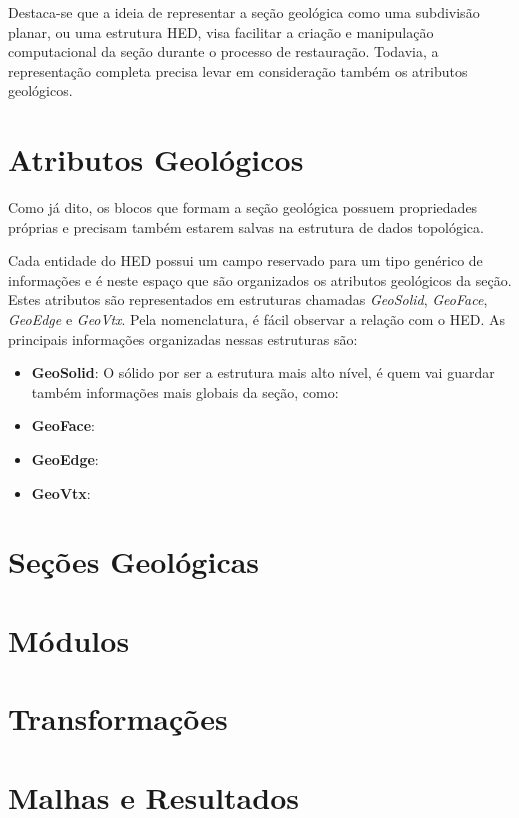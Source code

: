 Destaca-se que a ideia de representar a seção geológica como uma subdivisão planar, ou uma estrutura HED, visa facilitar a criação e manipulação computacional da seção durante o processo de restauração. Todavia, a representação completa precisa levar em consideração também os atributos geológicos.

\section{Atributos Geológicos}

Como já dito, os blocos que formam a seção geológica possuem propriedades próprias e precisam também estarem salvas na estrutura de dados topológica.

Cada entidade do HED possui um campo reservado para um tipo genérico de informações e é neste espaço que são organizados os atributos geológicos da seção. Estes atributos são representados em estruturas chamadas \textit{GeoSolid}, \textit{GeoFace}, \textit{GeoEdge} e \textit{GeoVtx}. Pela nomenclatura, é fácil observar a relação com o HED. As principais informações organizadas nessas estruturas são:

\renewcommand{\labelitemi}{•}
\begin{itemize}
  \item \textbf{GeoSolid}: O sólido por ser a estrutura mais alto nível, é quem vai guardar também informações mais globais da seção, como:
  \item \textbf{GeoFace}: 
  \item \textbf{GeoEdge}: 
  \item \textbf{GeoVtx}: 
\end{itemize}


\section{Seções Geológicas} %

\section{Módulos}

\section{Transformações}

\section{Malhas e Resultados}

